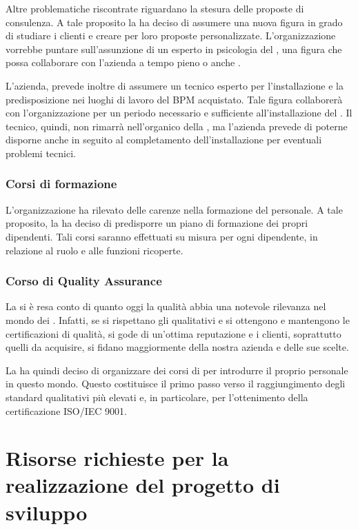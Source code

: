 Altre problematiche riscontrate riguardano la stesura delle proposte di consulenza. A tale proposito la \customer ha deciso di assumere una nuova figura in grado di studiare i clienti e creare per loro proposte personalizzate. L'organizzazione vorrebbe puntare sull'assunzione di un esperto in psicologia del \mktg , una figura che possa collaborare con l'azienda a tempo pieno o anche .

L'azienda, prevede inoltre di assumere un tecnico esperto per l'installazione e la predisposizione nei luoghi di lavoro del \sw BPM acquistato. Tale figura collaborerà con l'organizzazione per un periodo necessario e sufficiente all'installazione del \sw.
Il tecnico, quindi, non rimarrà nell'organico della \customer , ma l'azienda prevede di poterne disporne anche in seguito al completamento dell'installazione per eventuali problemi tecnici.


\subsubsection{Corsi di formazione} 
L'organizzazione ha rilevato delle carenze nella formazione del personale. A tale proposito, la \customer ha deciso di predisporre un piano di formazione dei propri dipendenti. Tali corsi saranno effettuati su misura per ogni dipendente, in relazione al ruolo e alle funzioni ricoperte. 


\subsubsection{Corso di Quality Assurance}
 La \customer si è resa conto di quanto oggi la qualità abbia una notevole rilevanza nel mondo dei . Infatti, se si rispettano gli  qualitativi e si ottengono e mantengono le certificazioni di qualità, si gode di un'ottima reputazione e i clienti, soprattutto quelli da acquisire, si fidano maggiormente della nostra azienda e delle sue scelte.

La \customer ha quindi deciso di organizzare dei corsi di  per introdurre il proprio personale in questo mondo. Questo costituisce il primo passo verso il raggiungimento degli standard qualitativi più elevati e, in particolare,  per l'ottenimento della certificazione ISO/IEC 9001.

  
  
\section{Risorse richieste per la realizzazione del progetto di sviluppo}
